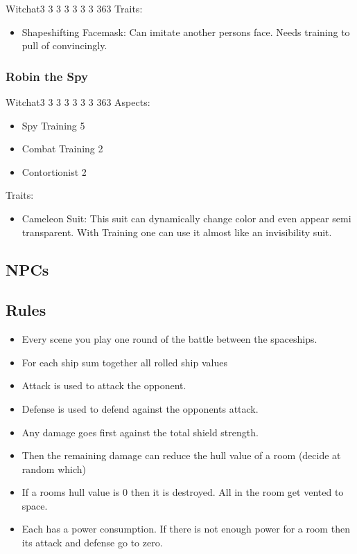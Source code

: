 \documentclass[11pt]{article}
\begin{document}
{\begin{npc}{Witch}{at}{3 3 3 3 3 3 3 3}{63}
Traits:
\begin{itemize}
\item Shapeshifting Facemask: Can imitate another persons face. Needs training to pull of convincingly.
\end{itemize}
\end{npc}
\subsubsection{Robin the Spy}
\label{sec:orgcffd589}

\begin{npc}{Witch}{at}{3 3 3 3 3 3 3 3}{63}
Aspects:
\begin{itemize}
\item Spy  Training 5
\item Combat Training 2
\item Contortionist 2
\end{itemize}
\columnbreak

Traits:
\begin{itemize}
\item Cameleon Suit: This suit can dynamically change color and even appear semi transparent. With Training one can use it almost like an invisibility suit.
\end{itemize}
\end{npc}
\subsection{NPCs}
\label{sec:org479cde1}

\subsection{Rules}
\label{sec:orgb1e21b3}

\begin{itemize}
\item Every scene you play one round of the battle between the spaceships.
\item For each ship sum together all rolled ship values
\item Attack is used to attack the opponent.
\item Defense is used to defend against the opponents attack.
\item Any damage goes first against the total shield strength.
\item Then the remaining damage can reduce the hull value of a room (decide at random which)
\item If a rooms hull value is 0 then it is destroyed. All in the room get vented to space.
\item Each has a power consumption. If there is not enough power for a room then its attack and defense go to zero.
\end{itemize}
}
\end{document}
